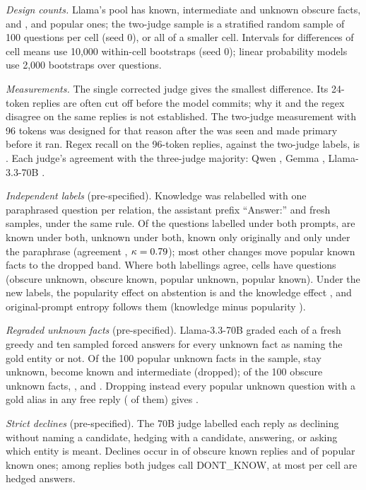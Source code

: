 \documentclass{article}
\begin{document}
\emph{Design counts.} Llama's pool has \lkObsPoolKnown{} known, \lkObsPoolMaybe{} intermediate and \lkObsPoolUnk{} unknown obscure facts, and \lkPopPoolKnown{}, \lkPopPoolMaybe{} and \lkPopPoolUnk{} popular ones; the two-judge sample is a stratified random sample of 100 questions per cell (seed 0), or all of a smaller cell. Intervals for differences of cell means use 10,000 within-cell bootstraps (seed 0); linear probability models use 2,000 bootstraps over questions.

\emph{Measurements.} The single corrected judge gives the smallest difference. Its 24-token replies are often cut off before the model commits; why it and the regex disagree on the same replies is not established. The two-judge measurement with 96 tokens was designed for that reason after the \hjLlamaDiff{} was seen and made primary before it ran. Regex recall on the 96-token replies, against the two-judge labels, is \hmLlamaRegexRecall. Each judge's agreement with the three-judge majority: Qwen \lkMajQwen, Gemma \lkMajGemma, Llama-3.3-70B \lkMajLlama.

\emph{Independent labels} (pre-specified). Knowledge was relabelled with one paraphrased question per relation, the assistant prefix ``Answer:'' and fresh samples, under the same rule. Of the \lcBothN{} questions labelled under both prompts, \lcKK{} are known under both, \lcUU{} unknown under both, \lcKU{} known only originally and \lcUK{} only under the paraphrase (agreement \lcAgree, $\kappa=0.79$); most other changes move popular known facts to the dropped band. Where both labellings agree, cells have \lcConsN{} questions (obscure unknown, obscure known, popular unknown, popular known). Under the new labels, the popularity effect on abstention is \eoPop{} \eoPopCI{} and the knowledge effect \eoKnow{} \eoKnowCI, and original-prompt entropy follows them (knowledge minus popularity \eoEntKmP{} \eoEntKmPCI).

\emph{Regraded unknown facts} (pre-specified). Llama-3.3-70B graded each of a fresh greedy and ten sampled forced answers for every unknown fact as naming the gold entity or not. Of the 100 popular unknown facts in the sample, \sePUStay{} stay unknown, \sePUKnown{} become known and \sePUInter{} intermediate (dropped); of the 100 obscure unknown facts, \seOUStay{}, \seOUKnown{} and \seOUInter. Dropping instead every popular unknown question with a gold alias in any free reply (\lcPUAlias{} of them) gives \lcAliasDrop{} \lcAliasDropCI.

\emph{Strict declines} (pre-specified). The 70B judge labelled each reply as declining without naming a candidate, hedging with a candidate, answering, or asking which entity is meant. Declines occur in \sdObsKnown{} of obscure known replies and \sdPopKnown{} of popular known ones; among replies both judges call DONT\_KNOW, at most \sdHedgedMax{} per cell are hedged answers.
\end{document}
